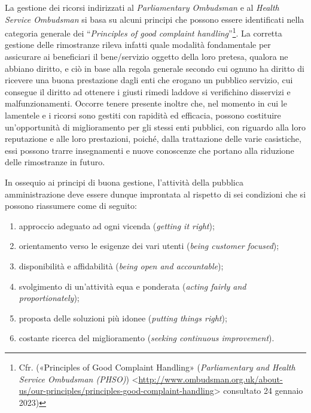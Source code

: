 \documentclass[12pt,it,a4paper,]{report}
\providecommand{\tightlist}{%
  \setlength{\itemsep}{0pt}\setlength{\parskip}{0pt}}
\begin{document}
La gestione dei ricorsi indirizzati al \emph{Parliamentary Ombudsman} e
al \emph{Health Service Ombudsman} si basa su alcuni principi che
possono essere identificati nella categoria generale dei
``\emph{Principles of good complaint handling}''\footnote{Cfr.
  ({«Principles of Good Complaint Handling»} (\emph{Parliamentary and
  Health Service Ombudsman (PHSO)})
  \textless{}\url{http://www.ombudsman.org.uk/about-us/our-principles/principles-good-complaint-handling}\textgreater{}
  consultato 24 gennaio 2023)}. La corretta gestione delle rimostranze
rileva infatti quale modalità fondamentale per assicurare ai beneficiari
il bene/servizio oggetto della loro pretesa, qualora ne abbiano diritto,
e ciò in base alla regola generale secondo cui ognuno ha diritto di
ricevere una buona prestazione dagli enti che erogano un pubblico
servizio, cui consegue il diritto ad ottenere i giusti rimedi laddove si
verifichino disservizi e malfunzionamenti. Occorre tenere presente
inoltre che, nel momento in cui le lamentele e i ricorsi sono gestiti
con rapidità ed efficacia, possono costituire un'opportunità di
miglioramento per gli stessi enti pubblici, con riguardo alla loro
reputazione e alle loro prestazioni, poiché, dalla trattazione delle
varie casistiche, essi possono trarre insegnamenti e nuove conoscenze
che portano alla riduzione delle rimostranze in futuro.

In ossequio ai principi di buona gestione, l'attività della pubblica
amministrazione deve essere dunque improntata al rispetto di sei
condizioni che si possono riassumere come di seguito:

\begin{enumerate}
\def\labelenumi{\arabic{enumi})}
\tightlist
\item
  approccio adeguato ad ogni vicenda (\emph{getting it right});
\item
  orientamento verso le esigenze dei vari utenti (\emph{being customer
  focused});
\item
  disponibilità e affidabilità (\emph{being open and accountable});
\item
  svolgimento di un'attività equa e ponderata (\emph{acting fairly and
  proportionately});
\item
  proposta delle soluzioni più idonee (\emph{putting things right});
\item
  costante ricerca del miglioramento (\emph{seeking continuous
  improvement}).
\end{enumerate}
\end{document}
